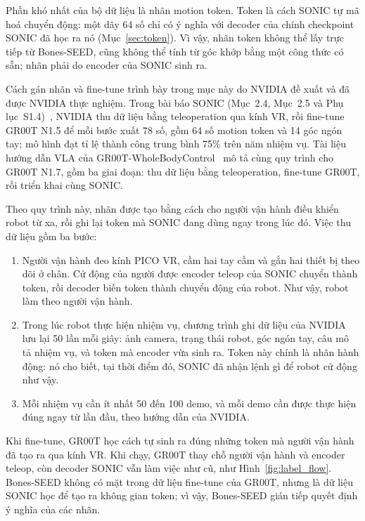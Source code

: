 \documentclass[12pt,a4paper,oneside]{report}
\begin{document}
Phần khó nhất của bộ dữ liệu là nhãn motion token. Token là cách SONIC tự mã hoá chuyển động: một dãy 64 số chỉ có ý nghĩa với decoder của chính checkpoint SONIC đã học ra nó (Mục~\ref{sec:token}). Vì vậy, nhãn token không thể lấy trực tiếp từ Bones-SEED, cũng không thể tính từ góc khớp bằng một công thức có sẵn; nhãn phải do encoder của SONIC sinh ra.

Cách gán nhãn và fine-tune trình bày trong mục này do NVIDIA đề xuất và đã được NVIDIA thực nghiệm. Trong bài báo SONIC (Mục~2.4, Mục~2.5 và Phụ lục~S1.4)~\cite{sonic}, NVIDIA thu dữ liệu bằng teleoperation qua kính VR, rồi fine-tune GR00T N1.5 để mỗi bước xuất 78 số, gồm 64 số motion token và 14 góc ngón tay; mô hình đạt tỉ lệ thành công trung bình 75\% trên năm nhiệm vụ. Tài liệu hướng dẫn VLA của GR00T-WholeBodyControl~\cite{wbc} mô tả cùng quy trình cho GR00T N1.7, gồm ba giai đoạn: thu dữ liệu bằng teleoperation, fine-tune GR00T, rồi triển khai cùng SONIC.

Theo quy trình này, nhãn được tạo bằng cách cho người vận hành điều khiển robot từ xa, rồi ghi lại token mà SONIC đang dùng ngay trong lúc đó. Việc thu dữ liệu gồm ba bước:
\begin{enumerate}
\item Người vận hành đeo kính PICO VR, cầm hai tay cầm và gắn hai thiết bị theo dõi ở chân. Cử động của người được encoder teleop của SONIC chuyển thành token, rồi decoder biến token thành chuyển động của robot. Như vậy, robot làm theo người vận hành.
\item Trong lúc robot thực hiện nhiệm vụ, chương trình ghi dữ liệu của NVIDIA lưu lại 50 lần mỗi giây: ảnh camera, trạng thái robot, góc ngón tay, câu mô tả nhiệm vụ, và token mà encoder vừa sinh ra. Token này chính là nhãn hành động: nó cho biết, tại thời điểm đó, SONIC đã nhận lệnh gì để robot cử động như vậy.
\item Mỗi nhiệm vụ cần ít nhất 50 đến 100 demo, và mỗi demo cần được thực hiện đúng ngay từ lần đầu, theo hướng dẫn của NVIDIA.
\end{enumerate}

Khi fine-tune, GR00T học cách tự sinh ra đúng những token mà người vận hành đã tạo ra qua kính VR. Khi chạy, GR00T thay chỗ người vận hành và encoder teleop, còn decoder SONIC vẫn làm việc như cũ, như Hình~\ref{fig:label_flow}. Bones-SEED không có mặt trong dữ liệu fine-tune của GR00T, nhưng là dữ liệu SONIC học để tạo ra không gian token; vì vậy, Bones-SEED gián tiếp quyết định ý nghĩa của các nhãn.
\end{document}
